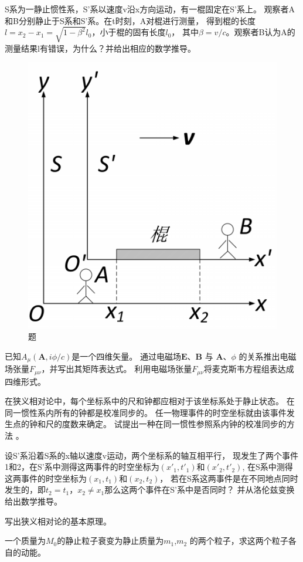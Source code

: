 \begin{question}
    S系为一静止惯性系，S'系以速度v沿x方向运动，有一棍固定在S'系上。
    观察者A和B分别静止于S系和S'系。在t时刻，A对棍进行测量，
    得到棍的长度$l=x_2-x_1=\sqrt{1-\beta^2}l_0$，小于棍的固有长度$l_0$，
    其中$\beta=v/c$。观察者B认为A的测量结果l有错误，为什么？并给出相应的数学推导。
    \begin{figure}[ht]
        \centering
        \includegraphics[height=3 cm]{images/q6_1.png}
        \caption{题\thequestion}
    \end{figure}
\end{question}

\begin{question}
    已知$A_\mu(\mathbf{A},i\phi /c)$是一个四维矢量。
    通过电磁场$\mathbf{E}$、$\mathbf{B}$ 与 $\mathbf{A}$、$\phi$ 
    的关系推出电磁场张量$F_{\mu \nu}$，并写出其矩阵表达式。
    利用电磁场张量$F_{\mu \nu}$将麦克斯韦方程组表达成四维形式。
\end{question}

\begin{question}
    在狭义相对论中，每个坐标系中的尺和钟都应相对于该坐标系处于静止状态。
    在同一惯性系内所有的钟都是校准同步的。
    任一物理事件的时空坐标就由该事件发生点的钟和尺的度数来确定。
    试提出一种在同一惯性参照系内钟的校准同步的方法 。
\end{question}

\begin{question}
    设S'系沿着S系的x轴以速度v运动，两个坐标系的轴互相平行，
    现发生了两个事件1和2，在S'系中测得这两事件的时空坐标为$(x'_1,t'_1)$和$(x'_2,t'_2)$,
    在S系中测得这两事件的时空坐标为$(x_1,t_1)$和$(x_2,t_2)$，
    若在S系这两事件是在不同地点同时发生的，即$t_2=t_1$，$x_2 \neq x_1$那么这两个事件在S'系中是否同时？
    并从洛伦兹变换给出数学推导。
\end{question}

\begin{question}
    写出狭义相对论的基本原理。
\end{question}

\begin{question}
    一个质量为$M_0$的静止粒子衰变为静止质量为$m_1$,$m_2$ 的两个粒子，求这两个粒子各自的动能。
\end{question}